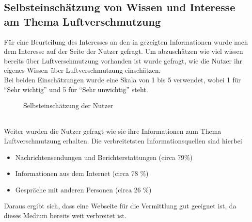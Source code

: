 \subsection{Selbsteinschätzung von Wissen und Interesse am Thema Luftverschmutzung}
Für eine Beurteilung des Interesses an den in \softwarename gezeigten Informationen wurde nach dem Interesse auf der Seite der Nutzer gefragt.
Um abzuschätzen wie viel wissen bereits über Luftverschmutzung vorhanden ist wurde gefragt, wie die Nutzer ihr eigenes Wissen über Luftverschmutzung einschätzen.
\\
Bei beiden Einschätzungen wurde eine Skala von 1 bis 5 verwendet, wobei 1 für \enquote{Sehr wichtig} und 5 für \enquote{Sehr unwichtig} steht.
\\
\begin{figure}[h]
    \caption{Selbsteinschätzung der Nutzer}
\end{figure}
\\
Weiter wurden die Nutzer gefragt wie sie ihre Informationen zum Thema Luftverschmutzung erhalten. Die verbreitetsten Informationsquellen sind hierbei
\begin{itemize} [noitemsep]
    \item Nachrichtensendungen und Berichterstattungen (circa 79\%)
    \item Informationen aus dem Internet (circa 78 \%)
    \item Gespräche mit anderen Personen (circa 26 \%)
\end{itemize}
Daraus ergibt sich, dass eine Webseite für die Vermittlung gut geeignet ist, da dieses Medium bereits weit verbreitet ist.

